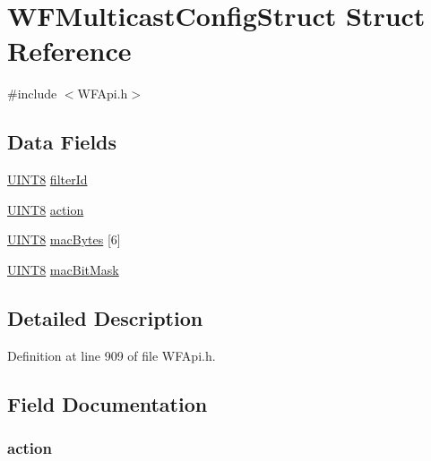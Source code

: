 \hypertarget{struct_w_f_multicast_config_struct}{}\section{W\+F\+Multicast\+Config\+Struct Struct Reference}
\label{struct_w_f_multicast_config_struct}


{\ttfamily \#include $<$W\+F\+Api.\+h$>$}

\subsection*{Data Fields}
\begin{DoxyCompactItemize}
\item 
\hyperlink{_generic_type_defs_8h_ab27e9918b538ce9d8ca692479b375b6a}{U\+I\+N\+T8} \hyperlink{struct_w_f_multicast_config_struct_af4dfe7a73d68de57144857ed208b4ee1}{filter\+Id}
\item 
\hyperlink{_generic_type_defs_8h_ab27e9918b538ce9d8ca692479b375b6a}{U\+I\+N\+T8} \hyperlink{struct_w_f_multicast_config_struct_ac1731c03e4e0dbe0c25f3a606a77df7e}{action}
\item 
\hyperlink{_generic_type_defs_8h_ab27e9918b538ce9d8ca692479b375b6a}{U\+I\+N\+T8} \hyperlink{struct_w_f_multicast_config_struct_a60d846b0c2fd3e7038fcd48f246a3b57}{mac\+Bytes} \mbox{[}6\mbox{]}
\item 
\hyperlink{_generic_type_defs_8h_ab27e9918b538ce9d8ca692479b375b6a}{U\+I\+N\+T8} \hyperlink{struct_w_f_multicast_config_struct_aa38c85c998eb2ae76de051679393007c}{mac\+Bit\+Mask}
\end{DoxyCompactItemize}


\subsection{Detailed Description}


Definition at line 909 of file W\+F\+Api.\+h.



\subsection{Field Documentation}
\hypertarget{struct_w_f_multicast_config_struct_ac1731c03e4e0dbe0c25f3a606a77df7e}{}
\subsubsection[{action}]{ action}\label{struct_w_f_multicast_config_struct_ac1731c03e4e0dbe0c25f3a606a77df7e}


